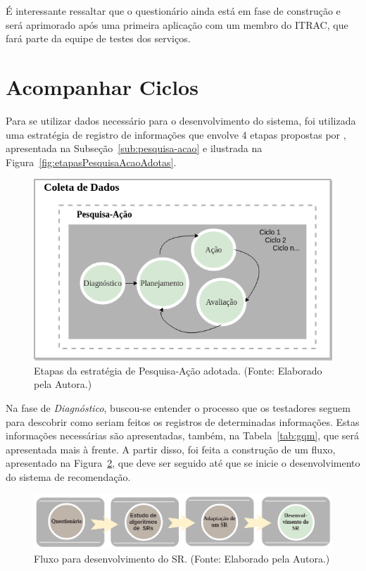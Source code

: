 É interessante ressaltar que o questionário ainda está em fase de construção e será aprimorado após uma primeira aplicação com um membro do ITRAC, que fará parte da equipe de testes dos serviços.

\section{Acompanhar Ciclos}
\label{sec:acompanhar_ciclos}

Para se utilizar dados necessário para o desenvolvimento do sistema, foi utilizada uma estratégia de registro de informações que envolve 4 etapas propostas por \cite{petersen2008systematic}, apresentada na Subseção~\ref{sub:pesquisa-acao} e ilustrada na Figura~\ref{fig:etapasPesquisaAcaoAdotas}.

        \begin{figure}[!htb]
          \centering
          \includegraphics[width=12cm]{figuras/etapasPesquisaAcao.png}
          \caption{Etapas da estratégia de Pesquisa-Ação adotada. (Fonte: Elaborado pela Autora.)}
          \label{fig:etapasPesquisaAcao}

        \end{figure}

Na fase de \textit{Diagnóstico}, buscou-se entender o processo que os testadores seguem para descobrir como seriam feitos os registros de determinadas informações. Estas informações necessárias são apresentadas, também, na Tabela~\ref{tab:gqm}, que será apresentada mais à frente. A partir disso, foi feita a construção de um fluxo, apresentado na Figura~\ref{fig:fluxo}, que deve ser seguido até que se inicie o desenvolvimento do sistema de recomendação.

        \begin{figure}[!htb]
          \centering
          \includegraphics[width=16cm]{figuras/fluxo.png}
          \caption{Fluxo para desenvolvimento do SR.  (Fonte: Elaborado pela Autora.)}
          \label{fig:fluxo}

        \end{figure}


